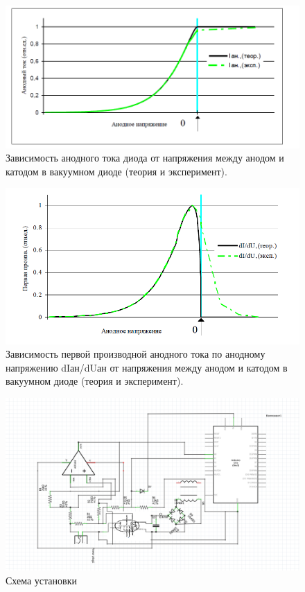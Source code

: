 \begin{figure}[h!p]
    \centering
    \includegraphics[scale=0.8]{image1.png}
    \caption{Зависимость анодного тока диода от напряжения между анодом и катодом в вакуумном диоде (теория и
эксперимент).}
    \label{fig:zavis_toka}
\end{figure}

\begin{figure}[h!p]
    \centering
  \includegraphics[scale=0.9]{image2.png}
   \caption{Зависимость первой производной анодного тока по анодному напряжению dIан/dUан от
напряжения между анодом и катодом в вакуумном диоде (теория и эксперимент).}
    \label{fig:zavis_proizv}
\end{figure}

\begin{figure}[h!p]
    \centering
    \includegraphics[scale=0.7]{схема.png}
    \caption{Схема установки}
    \label{fig:scheme_ust}
\end{figure}

